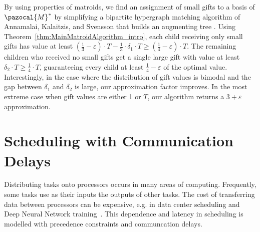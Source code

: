 By using properties of matroids, we find an assignment of small gifts to a basis of $\pazocal{M}^*$ by
simplifying a bipartite hypergraph matching algorithm
of Annamalai, Kalaitzis, and Svensson that builds an augmenting tree \cite{AlgoForSantaClaus-AnnamalaiKalaitzisSvenssonSODA15}.
Using Theorem~\ref{thm:MainMatroidAlgorithm_intro}, each child receiving only small gifts has value at least
$\left (\frac13 - \varepsilon \right ) \cdot T - \frac13 \cdot \delta_1 \cdot T \geq \left (\frac14 - \varepsilon \right ) \cdot T$. 
The remaining children who received no small gifts get a single large gift with value at least $\delta_2 \cdot T \geq \frac14 \cdot T$,
guaranteeing every child at least $\frac14 - \varepsilon$ of the optimal value.
Interestingly, in the case where the distribution of gift values is bimodal and the gap between $\delta_1$ and $\delta_2$ is large, 
our approximation factor improves.
In the most extreme case when gift values are either 1 or $T$, 
our algorithm returns a $3 + \varepsilon$ approximation. 









\section{Scheduling with Communication Delays} 


Distributing tasks onto processors occurs in many areas of computing.
Frequently, some tasks use as their inputs the outputs of other tasks. 
The cost of transferring data between processors can be expensive, 
e.g. in data center scheduling and Deep Neural Network training~\cite{coflow, zhao2015rapier}. 
This dependence and latency in scheduling is modelled with precedence constraints and communcation delays.

